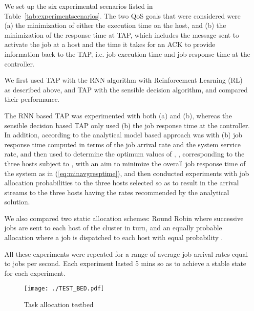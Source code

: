 \documentclass[journal]{IEEEtran}
\begin{document}
We set up the six experimental scenarios listed in Table~\ref{tab:experimentscenarios}. The two QoS goals that were considered were (a) the minimization of either the execution time on the host, and (b) the minimization of the response
time at TAP, which includes the message sent to activate the job at a host and the time it takes for an ACK to provide information back to the TAP, i.e. job execution time and job response time at the controller. 

We first  used TAP with the RNN algorithm with Reinforcement Learning (RL) as described above, and TAP with the sensible decision algorithm, and compared their performance. 

The RNN based TAP was experimented with both (a) and (b), whereas the sensible decision based TAP only
used (b) the job response time at the controller.  In addition, according to the analytical model based approach was  with (b) job response time 
computed in terms of the job arrival rate and the system service rate, and then used to determine the optimum values of , ,  
corresponding to the three hosts subject to , with an aim to minimize the overall job response time of the system as in (\ref{eq:minavgresptime}), and
then conducted experiments with job allocation probabilities to the three hosts selected
so as to result in the arrival streams to the three hosts having the rates recommended by the analytical solution. 

We also compared  two static allocation schemes: Round Robin where successive jobs are sent to each host of the cluster in turn, and an equally probable allocation where a job is dispatched to 
each host with equal probability .

All these experiments were repeated for a range of average job arrival rates  equal to  jobs per second. Each experiment lasted 5 mins so as to achieve a stable state for each experiment.

		\begin{figure}[ht]
     \centering
      \texttt{[image: ./TEST\_BED.pdf]} \caption{Task allocation testbed}
     \label{fig:testbed}
    \end{figure}
		
\end{document}
